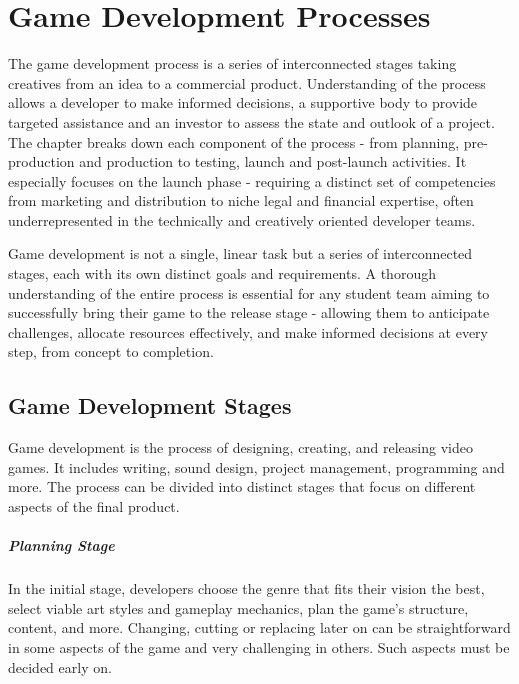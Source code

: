 \chapter{Game Development Processes}

\begin{chapterabstract}
	The game development process is a series of interconnected stages taking creatives from an idea to a commercial product. Understanding of the process allows a developer to make informed decisions, a supportive body to provide targeted assistance and an investor to assess the state and outlook of a project. The chapter breaks down each component of the process - from planning, pre-production and production to testing, launch and post-launch activities. It especially focuses on the launch phase - requiring a distinct set of competencies from marketing and distribution to niche legal and financial expertise, often underrepresented in the technically and creatively oriented developer teams.
\end{chapterabstract}

Game development is not a single, linear task but a series of interconnected stages, each with its own distinct goals and requirements. A thorough understanding of the entire process is essential for any student team aiming to successfully bring their game to the release stage - allowing them to anticipate challenges, allocate resources effectively, and make informed decisions at every step, from concept to completion.

\section{Game Development Stages}
Game development is the process of designing, creating, and releasing video games. It includes writing, sound design, project management, programming and more. The process can be divided into distinct stages that focus on different aspects of the final product.

\paragraph{Planning Stage}
In the initial stage, developers choose the genre that fits their vision the best, select viable art styles and gameplay mechanics, plan the game’s structure, content, and more. Changing, cutting or replacing later on can be straightforward in some aspects of the game and very challenging in others. Such aspects must be decided early on.

